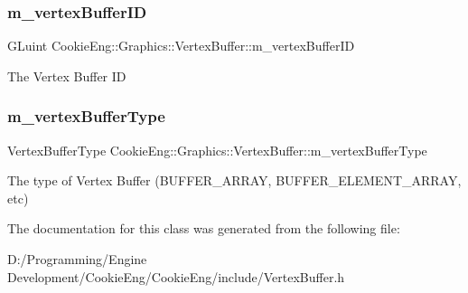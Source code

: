 \subsubsection{\texorpdfstring{m\+\_\+vertex\+Buffer\+ID}{m\_vertexBufferID}}
{\footnotesize\ttfamily G\+Luint Cookie\+Eng\+::\+Graphics\+::\+Vertex\+Buffer\+::m\+\_\+vertex\+Buffer\+ID\hspace{0.3cm}{\ttfamily [protected]}}

The Vertex Buffer ID \mbox{\label{class_cookie_eng_1_1_graphics_1_1_vertex_buffer_a37d75d306f50db1b63c22b51912402cc}} 
\subsubsection{\texorpdfstring{m\+\_\+vertex\+Buffer\+Type}{m\_vertexBufferType}}
{\footnotesize\ttfamily Vertex\+Buffer\+Type Cookie\+Eng\+::\+Graphics\+::\+Vertex\+Buffer\+::m\+\_\+vertex\+Buffer\+Type\hspace{0.3cm}{\ttfamily [protected]}}

The type of Vertex Buffer (B\+U\+F\+F\+E\+R\+\_\+\+A\+R\+R\+AY, B\+U\+F\+F\+E\+R\+\_\+\+E\+L\+E\+M\+E\+N\+T\+\_\+\+A\+R\+R\+AY, etc) 

The documentation for this class was generated from the following file\+:\begin{DoxyCompactItemize}
\item 
D\+:/\+Programming/\+Engine Development/\+Cookie\+Eng/\+Cookie\+Eng/include/Vertex\+Buffer.\+h\end{DoxyCompactItemize}
